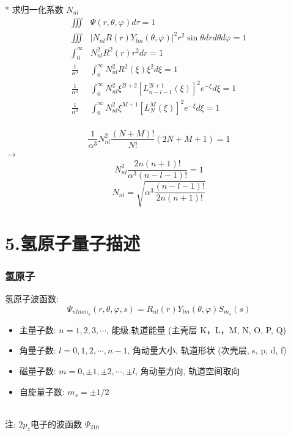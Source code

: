 \begin{frame}
	* 求归一化系数 $N_{nl}$ 
	\begin{equation*}
	\begin{split}
		\iiint  &\Psi(r,\theta,\varphi) d \tau =1  \\
		\iiint  &|N_{nl} R (r) Y_{lm} (\theta,\varphi)| ^2 r^2 \sin \theta dr d\theta d\varphi =1  \\
		\int_{0}^{\infty}  & N^2_{nl} R^2  (r)  r^2 dr =1   \\
		\frac{1}{\alpha ^3}	&\int_{0}^{\infty}  N^2_{nl}  R^2 (\xi)  \xi^2 d\xi =1   \\
		\frac{1}{\alpha ^3} &	\int_{0}^{\infty}  N^2_{nl}  \xi ^{2l+2}  [L_{n-l-1} ^{2l+1} (\xi)]^2 e^{-\xi}  d\xi =1   \\
		\frac{1}{\alpha ^3} &	\int_{0}^{\infty}  N^2_{nl}  \xi ^{M+1}  [L_N ^M (\xi)]^2 e^{-\xi}  d\xi =1   \\
	\end{split}		
	\end{equation*}	
\end{frame}		

\begin{frame}
	\begin{equation*}
		\frac{1}{\alpha ^3} 	  N^2_{nl}  \frac{(N+M)!}{N!} (2N+M+1) =1  	
	\end{equation*}	
	$\to$ \\
	\begin{equation*}
		N^2 _{nl}  \frac{2n (n+1)!} {\alpha^3 (n-l-1)!} =1
	\end{equation*}	
	\begin{equation*}
		N_{nl}  =\sqrt{\alpha^3 \frac{ (n-l-1)!}{2n (n+1)!}} 
	\end{equation*}	
\end{frame}		

\section{5.氢原子量子描述}
\begin{frame}
	\frametitle{氢原子}	
	氢原子波函数:
	{\large \begin{equation*}
		\Psi_{nlmm_s}(r,\theta,\varphi,s)= R_{nl} (r) Y_{lm} (\theta,\varphi)S_{m_s}(s)
	\end{equation*} }
	\begin{itemize}
		\item 主量子数: $n=1,2,3,\cdots$, 能级,轨道能量 (主壳层 K，L，M, N, O, P, Q)
		\item 角量子数: $l=0,1,2,\cdots, n-1$, 角动量大小, 轨道形状 (次壳层, s, p, d, f) 
		\item 磁量子数: $m=0,\pm 1,\pm 2,\cdots, \pm l$, 角动量方向, 轨道空间取向 
		\item 自旋量子数: $m_s=\pm 1/2$
	\end{itemize}
	~~\\
	注: $2p_z $电子的波函数 $\Psi_{210}$
\end{frame}


